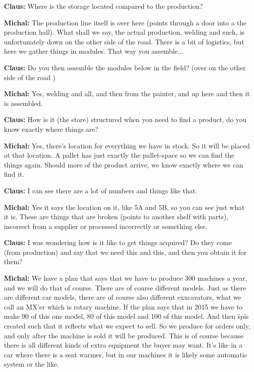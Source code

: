 \textbf{Claus:} Where is the storage located compared to the production?\nl

\textbf{Michal:} The production line itself is over here (points through a door
into a the production hall).
What shall we say, the actual production, welding and such, is unfortunately
down on the other side of the road. There is a bit of logistics, but here we
gather things in modules. That way you assemble...\nl

\textbf{Claus:} Do you then assemble the modules below in the field? (over on
the other side of the road )\nl

\textbf{Michal:} Yes, welding and all, and then from the painter, and up here
and then it is assembled.\nl

\textbf{Claus:} How is it (the store) structured when you need to find a
product, do you know exactly where things are?\nl

\textbf{Michal:} Yes, there's location for everything we have in stock. So it
will be placed at that location. A pallet has just exactly the pallet-space so
we can find the things again. Should more of the product arrive, we know exactly
where we can find it.\nl

\textbf{Claus:} I can see there are a lot of numbers and things like that.\nl

\textbf{Michal:} Yes it says the location on it, like 5A and 5B, so you can see
just what it is. These are things that are broken (points to
another shelf with parts), incorrect from a supplier or processed incorrectly or
something else.\nl

\textbf{Claus:} I was wondering how is it like to get things acquired? Do they
come (from production) and say that we need this and this, and then you obtain
it for them?\nl

\textbf{Michal:} We have a plan that says that we have to produce 300 machines a
year, and we will do that of course.  There are of course different models. Just
as there are different car models, there are of course also different
exxcavators, what we call an MX'er which is rotary machine.
If the plan says that in 2015 we have to make 90 of this one model, 80 of this
model and 100 of this model. And then \"sp\" is created such that it reflects
what we expect to sell. So we produce for orders only, and only after the
machine is sold it will be produced. This is of course because there is all
different kinds of extra equipment the buyer may want. It's like in a car where
there is a seat warmer, but in our machines it is likely some automatic system
or the like.\nl

